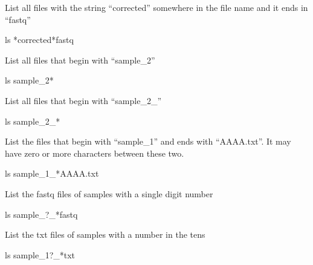 \documentclass[
  letterpaper,
  DIV=11,
  numbers=noendperiod]{scrreprt}
\newenvironment{Shaded}{\begin{snugshade}}{\end{snugshade}}
\newcommand{\FunctionTok}[1]{\textcolor[rgb]{0.28,0.35,0.67}{#1}}
\newcommand{\NormalTok}[1]{\textcolor[rgb]{0.00,0.23,0.31}{#1}}
\newcommand{\PreprocessorTok}[1]{\textcolor[rgb]{0.68,0.00,0.00}{#1}}
\begin{document}
List all files with the string ``corrected'' somewhere in the file name
and it ends in ``fastq''

\begin{Shaded}
\begin{Highlighting}[]
\FunctionTok{ls} \PreprocessorTok{*}\NormalTok{corrected}\PreprocessorTok{*}\NormalTok{fastq}
\end{Highlighting}
\end{Shaded}

List all files that begin with ``sample\_2''

\begin{Shaded}
\begin{Highlighting}[]
\FunctionTok{ls}\NormalTok{ sample\_2}\PreprocessorTok{*}
\end{Highlighting}
\end{Shaded}

List all files that begin with ``sample\_2\_''

\begin{Shaded}
\begin{Highlighting}[]
\FunctionTok{ls}\NormalTok{ sample\_2\_}\PreprocessorTok{*}
\end{Highlighting}
\end{Shaded}

List the files that begin with ``sample\_1'' and ends with ``AAAA.txt''.
It may have zero or more characters between these two.

\begin{Shaded}
\begin{Highlighting}[]
\FunctionTok{ls}\NormalTok{ sample\_1\_}\PreprocessorTok{*}\NormalTok{AAAA.txt}
\end{Highlighting}
\end{Shaded}

List the fastq files of samples with a single digit number

\begin{Shaded}
\begin{Highlighting}[]
\FunctionTok{ls}\NormalTok{ sample\_}\PreprocessorTok{?}\NormalTok{\_}\PreprocessorTok{*}\NormalTok{fastq}
\end{Highlighting}
\end{Shaded}

List the txt files of samples with a number in the tens

\begin{Shaded}
\begin{Highlighting}[]
\FunctionTok{ls}\NormalTok{ sample\_1}\PreprocessorTok{?}\NormalTok{\_}\PreprocessorTok{*}\NormalTok{txt}
\end{Highlighting}
\end{Shaded}
\end{document}
